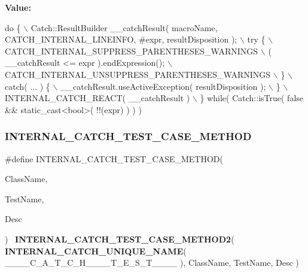 {\bfseries Value\+:}
\begin{DoxyCode}
\textcolor{keywordflow}{do} \{ \(\backslash\)
        Catch::ResultBuilder \_\_catchResult( macroName, CATCH_INTERNAL_LINEINFO, #expr, resultDisposition );
       \(\backslash\)
        try \{ \(\backslash\)
            CATCH\_INTERNAL\_SUPPRESS\_PARENTHESES\_WARNINGS \(\backslash\)
            ( \_\_catchResult <= expr ).endExpression(); \(\backslash\)
            CATCH\_INTERNAL\_UNSUPPRESS\_PARENTHESES\_WARNINGS \(\backslash\)
        \} \(\backslash\)
        catch( ... ) \{ \(\backslash\)
            \_\_catchResult.useActiveException( resultDisposition ); \(\backslash\)
        \} \(\backslash\)
        INTERNAL\_CATCH\_REACT( \_\_catchResult ) \(\backslash\)
    \} \textcolor{keywordflow}{while}( Catch::isTrue( \textcolor{keyword}{false} && static\_cast<bool>( !!(expr) ) ) )
\end{DoxyCode}
\mbox{\label{catch_8hpp_a46bb9f683226dfa2c857dd62af7aa106}} 
\subsubsection{I\+N\+T\+E\+R\+N\+A\+L\+\_\+\+C\+A\+T\+C\+H\+\_\+\+T\+E\+S\+T\+\_\+\+C\+A\+S\+E\+\_\+\+M\+E\+T\+H\+OD}
{\footnotesize\ttfamily \#define I\+N\+T\+E\+R\+N\+A\+L\+\_\+\+C\+A\+T\+C\+H\+\_\+\+T\+E\+S\+T\+\_\+\+C\+A\+S\+E\+\_\+\+M\+E\+T\+H\+OD(\begin{DoxyParamCaption}\item[{}]{Class\+Name,  }\item[{}]{Test\+Name,  }\item[{}]{Desc }\end{DoxyParamCaption})~\textbf{ I\+N\+T\+E\+R\+N\+A\+L\+\_\+\+C\+A\+T\+C\+H\+\_\+\+T\+E\+S\+T\+\_\+\+C\+A\+S\+E\+\_\+\+M\+E\+T\+H\+O\+D2}( \textbf{ I\+N\+T\+E\+R\+N\+A\+L\+\_\+\+C\+A\+T\+C\+H\+\_\+\+U\+N\+I\+Q\+U\+E\+\_\+\+N\+A\+ME}( \+\_\+\+\_\+\+\_\+\+\_\+\+C\+\_\+\+A\+\_\+\+T\+\_\+\+C\+\_\+\+H\+\_\+\+\_\+\+\_\+\+\_\+\+T\+\_\+\+E\+\_\+\+S\+\_\+\+T\+\_\+\+\_\+\+\_\+\+\_\+ ), Class\+Name, Test\+Name, Desc )}

